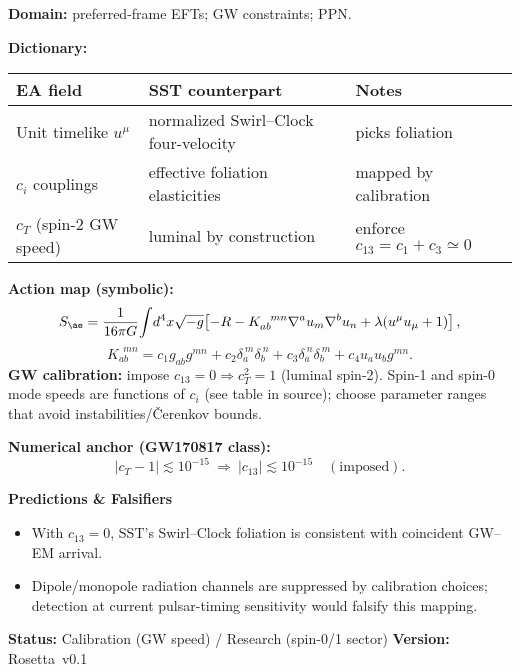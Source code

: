 \documentclass[11pt]{article}
\begin{document}
    \begin{tcolorbox}[title=Rosetta Card: Einstein–Æther/Khronon $\to$ SST (Swirl–Clock)]
    \textbf{Domain:} preferred-frame EFTs; GW constraints; PPN.

    \textbf{Dictionary:}
    \begin{tabular}{@{}lll@{}}
    \toprule
    EA field & SST counterpart & Notes \\
    \midrule
    Unit timelike $u^\mu$ & normalized Swirl–Clock four-velocity & picks foliation \\
    $c_i$ couplings & effective foliation elasticities & mapped by calibration \\
    $c_T$ (spin-2 GW speed) & luminal by construction & enforce $c_{13}\!=\!c_1{+}c_3\simeq 0$ \\
    \bottomrule
    \end{tabular}

    \textbf{Action map (symbolic):}
    \[
        S_{\ae}=\frac{1}{16\pi G}\!\int\! d^4x\sqrt{-g}\!\left[-R
        -K^{\ \ mn}_{ab}\nabla^a u_m \nabla^b u_n
        +\lambda(u^\mu u_\mu+1)\right],
    \]
    \[
        K^{\ \ mn}_{ab}=c_1 g_{ab}g^{mn}+c_2\delta_a^{\ m}\delta_b^{\ n}+c_3\delta_a^{\ n}\delta_b^{\ m}
        +c_4 u_a u_b g^{mn}.
    \]
    \textbf{GW calibration:} impose $c_{13}=0\Rightarrow c_T^2=1$ (luminal spin-2). Spin-1 and spin-0 mode speeds are functions of $c_i$ (see table in source); choose parameter ranges that avoid instabilities/Čerenkov bounds.

    \textbf{Numerical anchor (GW170817 class):}
    \[
        |c_T-1|\lesssim 10^{-15}\ \Rightarrow\ |c_{13}|\lesssim 10^{-15}\quad(\text{imposed}).
    \]

    \textbf{Predictions \& Falsifiers}
    \begin{itemize}\itemsep2pt
    \item With $c_{13}\!=\!0$, SST’s Swirl–Clock foliation is consistent with coincident GW–EM arrival.
    \item Dipole/monopole radiation channels are suppressed by calibration choices; detection at current pulsar-timing sensitivity would falsify this mapping.
    \end{itemize}

    \textbf{Status:} Calibration (GW speed) / Research (spin-0/1 sector) \hfill \textbf{Version:} Rosetta~v0.1
    \end{tcolorbox}

	
	
\end{document}
